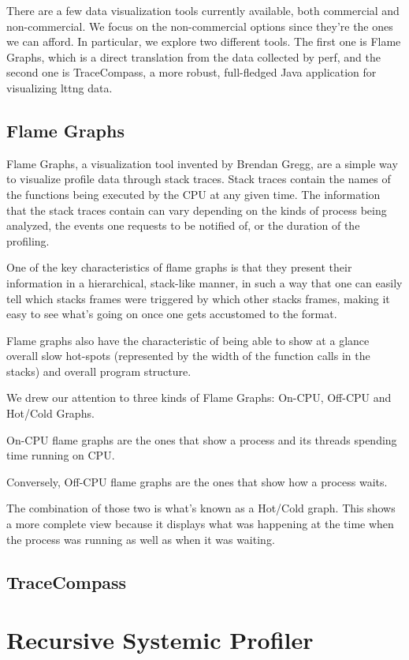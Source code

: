 \documentclass[10pt]{article}
\begin{document}
There are a few data visualization tools currently available, both commercial and
non-commercial. We focus on the non-commercial options since they're the ones we
can afford. In particular, we explore two different tools. The first one is Flame
Graphs, which is a direct translation from the data collected by perf, and the
second one is TraceCompass, a more robust, full-fledged Java application for
visualizing lttng data.

\subsection{Flame Graphs}

Flame Graphs, a visualization tool invented by Brendan Gregg, are a simple way to
visualize profile data through stack traces. Stack traces contain the names of
the functions being executed by the CPU at any given time. The information that
the stack traces contain can vary depending on the kinds of process being
analyzed, the events one requests to be notified of, or the duration of the
profiling.

One of the key characteristics of flame graphs is that they present their
information in a hierarchical, stack-like manner, in such a way that one can
easily tell which stacks frames were triggered by which other stacks frames,
making it easy to see what's going on once one gets accustomed to the format.

Flame graphs also have the characteristic of being able to show at a glance
overall slow hot-spots (represented by the width of the function calls in the
stacks) and overall program structure.

We drew our attention to three kinds of Flame Graphs: On-CPU, Off-CPU and
Hot/Cold Graphs.

On-CPU flame graphs are the ones that show a process and its threads spending
time running on CPU.

Conversely, Off-CPU flame graphs are the ones that show how a process waits.

The combination of those two is what's known as a Hot/Cold graph. This shows a
more complete view because it displays what was happening at the time when the
process was running as well as when it was waiting.

\subsection{TraceCompass}

\section{Recursive Systemic Profiler}
\end{document}
